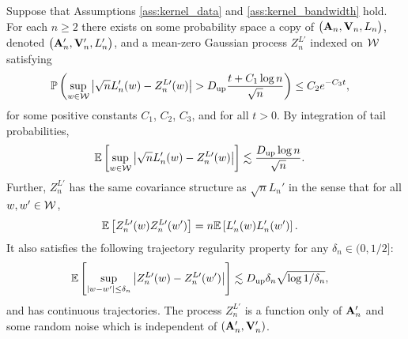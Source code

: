 \begin{lemma}
  \label{lem:kernel_app_strong_approx_Ln}

  Suppose that Assumptions
  \ref{ass:kernel_data}
  and
  \ref{ass:kernel_bandwidth} hold.
  For each $n \geq 2$
  there exists
  on some probability space
  a copy of $\big(\mathbf{A}_n, \mathbf{V}_n, L_n\big)$,
  denoted $\big(\mathbf{A}_n', \mathbf{V}_n', L_n'\big)$,
  and a mean-zero Gaussian process
  $Z^{L\prime}_n$
  indexed on $\mathcal{W}$ satisfying
  \begin{align*}
    \mathbb{P}\left(
      \sup_{w \in \mathcal{W}}
      \big| \sqrt{n} L'_n(w) -  Z_n^{L\prime}(w)\big|
      > D_{\textup{up}}
      \frac{t + C_1 \log n}{\sqrt{n}}
    \right)
    &\leq C_2 e^{-C_3 t},
  \end{align*}
  for some positive constants
  $C_1$, $C_2$, $C_3$,
  and for all $t > 0$.
  By integration of tail probabilities,
  \begin{align*}
    \mathbb{E}\left[
      \sup_{w \in \mathcal{W}}
      \big| \sqrt{n} L_n'(w) -  Z_n^{L\prime}(w)\big|
    \right]
    &\lesssim
    \frac{D_{\textup{up}} \log n}{\sqrt{n}}.
  \end{align*}
  Further,
  $Z_n^{L\prime}$ has the same covariance structure as
  $\sqrt{n} L_n'$ in the sense that for all $w, w' \in \mathcal{W}$,
  \begin{align*}
    \mathbb{E}\left[
      Z_n^{L\prime}(w)
      Z_n^{L\prime}(w')
    \right]
    &=
    n
    \mathbb{E}\left[
      L_n'(w)
      L_n'(w')
    \right].
  \end{align*}
  It also satisfies the following
  trajectory regularity property
  for any $\delta_n \in (0, 1/2]$:
  \begin{align*}
    \mathbb{E}\left[
      \sup_{|w-w'| \leq \delta_n}
      \big|
      Z_n^{L\prime}(w)
      - Z_n^{L\prime}(w')
      \big|
    \right]
    &\lesssim
    D_{\textup{up}}
    \delta_n \sqrt{\log 1/\delta_n},
  \end{align*}
  and has continuous trajectories.
  The process $Z_n^{L\prime}$
  is a function only of $\mathbf{A}_n'$
  and some random noise
  which is independent of $(\mathbf{A}_n', \mathbf{V}_n')$.

\end{lemma}

